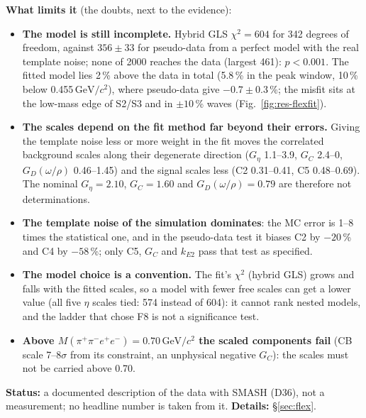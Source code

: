 \documentclass[11pt,a4paper]{article}
\newcommand{\Mfour}{\ensuremath{M(\pi^{+}\pi^{-}e^{+}e^{-})}\xspace}
\newcommand{\GeVcc}{\ensuremath{\mathrm{GeV}/c^{2}}\xspace}
\newcommand{\kEtwo}{\ensuremath{k_{E2}}\xspace}
\newcommand{\Geta}{\ensuremath{G_\eta}\xspace}
\begin{document}
\textbf{What limits it} (the doubts, next to the evidence):
\begin{itemize}\setlength{\itemsep}{1pt}
\item \textbf{The model is still incomplete.} Hybrid GLS $\chi^2=604$ for 342 degrees of freedom, against $356\pm33$ for pseudo-data from a perfect
      model with the real template noise; none of 2000 reaches the data (largest 461): $p<0.001$. The fitted model lies 2\,\% above the data in
      total (5.8\,\% in the peak window, 10\,\% below 0.455\,\GeVcc), where pseudo-data give $-0.7\pm0.3$\,\%; the misfit sits at the low-mass edge of
      S2/S3 and in $\pm10$\,\% waves (Fig.~\ref{fig:res-flexfit}).
\item \textbf{The scales depend on the fit method far beyond their errors.} Giving the template noise less or more weight in the fit moves the
      correlated background scales along their degenerate direction (\Geta 1.1--3.9, $G_C$ 2.4--0, $G_D(\omega/\rho)$ 0.46--1.45) and the signal
      scales less (C2 0.31--0.41, C5 0.48--0.69). The nominal \Geta $=2.10$, $G_C=1.60$ and $G_D(\omega/\rho)=0.79$ are therefore not determinations.
\item \textbf{The template noise of the simulation dominates}: the MC error is 1--8 times the statistical one, and in the pseudo-data test it
      biases C2 by $-20$\,\% and C4 by $-58$\,\%; only C5, $G_C$ and \kEtwo pass that test as specified.
\item \textbf{The model choice is a convention.} The fit's $\chi^2$ (hybrid GLS) grows and falls with the fitted scales, so a model with fewer free
      scales can get a lower value (all five $\eta$ scales tied: 574 instead of 604): it cannot rank nested models, and the ladder that chose F8 is
      not a significance test.
\item \textbf{Above \Mfour$=0.70$\,\GeVcc the scaled components fail} (CB scale 7--8$\sigma$ from its constraint, an unphysical negative $G_C$):
      the scales must not be carried above 0.70.
\end{itemize}
\textbf{Status:} a documented description of the data with SMASH (D36), not a measurement; no headline number is taken from it.
\textbf{Details:} \S\ref{sec:flex}.
\end{document}
